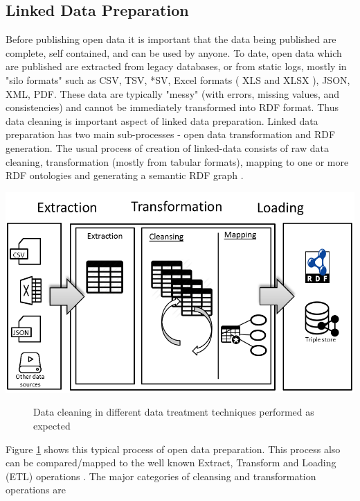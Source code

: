 \subsection{Linked Data Preparation}
\label{sec:opendatapreparation}
\noindent Before publishing open data it is important that the data being published are complete, self contained, and can be used by anyone. To date, open data which are published are extracted from legacy databases, or from static logs, mostly \cite{collaborativeopendataversioning} in "silo formats" such as CSV, TSV, *SV, Excel formats ( XLS and XLSX ), JSON, XML, PDF. These data are typically "messy" (with errors, missing values, and consistencies) and cannot be immediately transformed into RDF format. Thus data cleaning is important aspect of linked data preparation. Linked data preparation has two main sub-processes - open data transformation and RDF generation. The usual process of creation of linked-data consists of raw data cleaning, transformation (mostly from tabular formats), mapping to one or more RDF ontologies and generating a semantic RDF graph \cite{datagraftsimplyfyingopendatapublishing}. 
\begin{center}
	\includegraphics[width=38em]{./Figures/opendatapreparation2}
	\begin{figure}[htbp]
    \caption{Data cleaning in different data treatment techniques performed as expected}
    \label{fig:opendataprep}
	\end{figure}
\end{center}
\noindent Figure \ref{fig:opendataprep} shows this typical process of open data preparation. This process also can be compared/mapped to the well known Extract, Transform and Loading (ETL) operations \cite{collaborativeopendataversioning}. The major categories of cleansing and transformation operations are 
